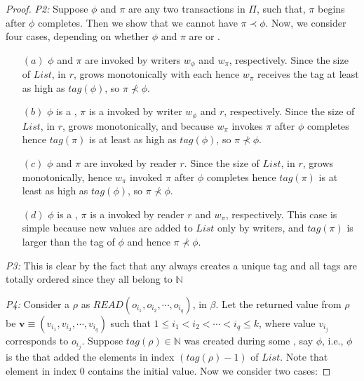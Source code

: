 {\begin{proof}
	\emph{P2:}  Suppose $\phi$ and $ \pi$ are any two transactions in $\Pi$, such that, $\pi$ begins after $\phi$ completes. 
	Then we show that we cannot have $\pi \prec \phi$. Now, we consider four cases, depending on whether $\phi$ and $\pi$ are \rots{} or \wots{}.	
	\begin{enumerate}
	    \item [$(a)$] $\phi$ and $\pi$ are \wots{} invoked by writers $w_{\phi}$ and $w_{\pi}$, respectively. Since the size of $List$, in $r$,  grows monotonically with each \wot{}  hence  $w_{\pi}$ receives the  tag at least as high as $tag(\phi)$, so $\pi\not \prec \phi$.
	       \item [$(b)$] $\phi$ is a \wot{}, $\pi$ is a \rots{} invoked by writer $w_{\phi}$ and $r$, respectively.  
	        Since the size of $List$, in $r$,  grows monotonically, and because  $w_{\pi}$ invokes $\pi$ after $\phi$ completes hence  $tag(\pi)$ is at least as high as $tag(\phi)$, so $\pi\not \prec \phi$.
	        \item[$(c)$] $\phi$ and $\pi$ are \rots{}  invoked by reader $r$. 
	           Since the size of $List$, in $r$,  grows monotonically,  hence  $w_{\pi}$ invoked $\pi$ after $\phi$ completes hence $tag(\pi)$ is at least as high as $tag(\phi)$, so $\pi\not \prec \phi$.
	         \item [$(d)$] $\phi$ is a \rot{}, $\pi$ is a \wot{}  invoked by reader $r$ and $w_{\pi}$, respectively.
	         This case is simple because new values are added to $List$  only  by writers, and $tag(\pi)$ 
	         is larger than the tag of $\phi$ and hence   $\pi\not \prec \phi$. 
	\end{enumerate}
	
	\emph{P3:} This is clear by the fact that any \wot{} always creates a unique tag and all tags are totally ordered since they all belong to $\mathbb{N}$
	
	\emph{P4:} Consider a \rot{} $\rho$ as $READ(o_{i_1}, o_{i_2}, \cdots, o_{i_q})$, in $\beta$. 
Let the returned value from $\rho$ be $\mathbf{v} \equiv $$(v_{i_1}, v_{i_2}, \cdots, v_{i_q})$ such that 
$1 \leq {i_1} <  {i_2} <  \cdots <  {i_q} \leq k$, where value  $v_{i_j}$ corresponds to $o_{i_j}$. 
	Suppose $tag(\rho) \in \mathbb{N}$ was created during some \wot{}, say $\phi$, i.e., $\phi$ is the \wot{} that 
	added the elements in index $(tag(\rho)-1)$ of $List$. Note that element in index $0$ contains the initial value.
	 Now we consider two cases:
	 

\end{proof}}
